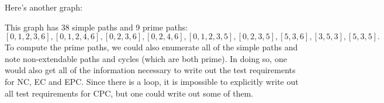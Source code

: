 \documentclass[11pt]{article}
\begin{document}
Here's another graph:
\begin{center}
\end{center}
This graph has 38 simple paths and 9 prime paths:
\[ [0, 1, 2, 3, 6], [0, 1, 2, 4, 6], [0, 2, 3, 6], [0, 2, 4, 6], [0, 1, 2, 3, 5], [0, 2, 3, 5], [5, 3, 6], [3, 5, 3], [5, 3, 5]. \]
To compute the prime paths, we could also enumerate all of the simple
paths and note non-extendable paths and cycles (which are both prime).
In doing so, one would also get all of the information necessary to
write out the test requirements for NC, EC and EPC. Since there is a
loop, it is impossible to explicitly write out all test requirements
for CPC, but one could write out some of them.
\end{document}

